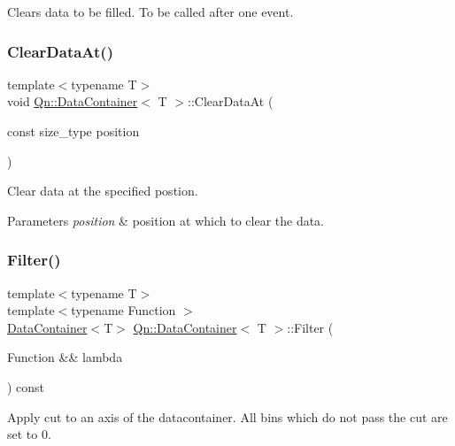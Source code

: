 Clears data to be filled. To be called after one event. \mbox{\label{classQn_1_1DataContainer_a60a01024cc3b7c421ff1270608975ee7}} 
\subsubsection{\texorpdfstring{Clear\+Data\+At()}{ClearDataAt()}}
{\footnotesize\ttfamily template$<$typename T$>$ \\
void \mbox{\hyperlink{classQn_1_1DataContainer}{Qn\+::\+Data\+Container}}$<$ T $>$\+::Clear\+Data\+At (\begin{DoxyParamCaption}\item[{const size\+\_\+type}]{position }\end{DoxyParamCaption})\hspace{0.3cm}{\ttfamily [inline]}}

Clear data at the specified postion. 
\begin{DoxyParams}{Parameters}
{\em position} & position at which to clear the data. \\
\hline
\end{DoxyParams}
\mbox{\label{classQn_1_1DataContainer_a2c165924fca1953fd09f2a7aabdb608c}} 
\subsubsection{\texorpdfstring{Filter()}{Filter()}}
{\footnotesize\ttfamily template$<$typename T$>$ \\
template$<$typename Function $>$ \\
\mbox{\hyperlink{classQn_1_1DataContainer}{Data\+Container}}$<$T$>$ \mbox{\hyperlink{classQn_1_1DataContainer}{Qn\+::\+Data\+Container}}$<$ T $>$\+::Filter (\begin{DoxyParamCaption}\item[{Function \&\&}]{lambda }\end{DoxyParamCaption}) const\hspace{0.3cm}{\ttfamily [inline]}}

Apply cut to an axis of the datacontainer. All bins which do not pass the cut are set to 0. \mbox{\label{classQn_1_1DataContainer_a8c603692b39277e0cfbaa83c69c31336}} 
